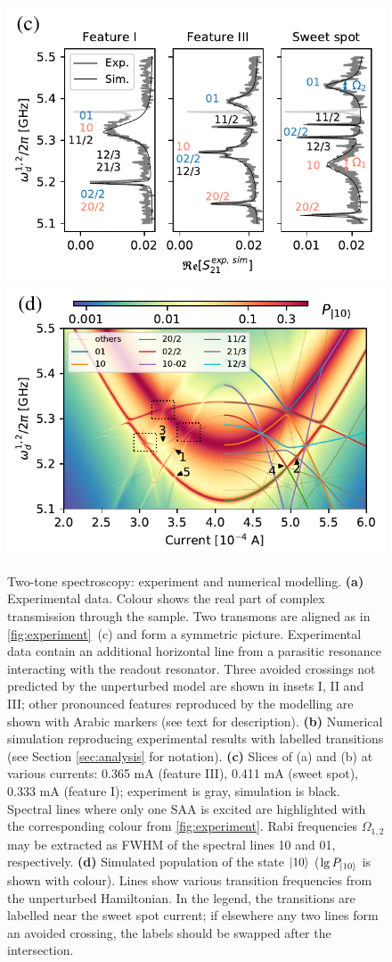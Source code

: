 \documentclass[%
 pra,
 amsmath,amssymb,
 reprint,%
]{revtex4-1}
\begin{document}
\begin{figure}
	\includegraphics[width=.495\linewidth]{main_picture_slices}
	\includegraphics[width=.495\linewidth]{stationary}
	\caption{Two-tone spectroscopy: experiment 
	and numerical modelling. \textbf{(a)} 
	Experimental data. Colour shows the real part 
	of complex transmission  through the sample. 
	Two transmons are aligned as in 
	\autoref{fig:experiment}~(c) and form a 
	symmetric picture. Experimental data contain 
	an additional horizontal line from a 
	parasitic resonance interacting with the 
	readout resonator. Three avoided crossings 
	not predicted by the unperturbed model are 
	shown in insets I, II and III; other 
	pronounced features reproduced by the 
	modelling are shown with Arabic markers (see 
	text for description). \textbf{(b)} Numerical 
	simulation reproducing experimental results 
	with labelled transitions (see Section 
	\ref{sec:analysis} for notation). 
	\textbf{(c)} Slices of (a) and (b) at various 
	currents: 0.365 mA (feature III), 0.411 mA 
	(sweet spot), 0.333 mA (feature I); 
	experiment is gray, simulation is black. 
	Spectral lines where only one SAA is excited 
	are highlighted with the corresponding colour 
	from \autoref{fig:experiment}. Rabi 
	frequencies $\Omega_{1,2}$ may be extracted 
	as FWHM of the spectral lines 10 and 01, 
	respectively. \textbf{(d)} Simulated 
	population of the state $\ket{10}$ ($\lg 
	P_{\ket{10}}$ is shown with colour). Lines 
	show various transition frequencies from the 
	unperturbed Hamiltonian. In the legend, the 
	transitions are labelled near the sweet spot current; if 
	elsewhere any two lines form an avoided 
	crossing, the labels should be swapped after 
	the intersection.}
	\label{fig:two-tone}
\end{figure}
\end{document}
